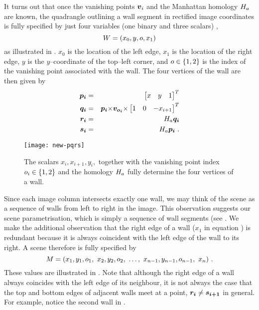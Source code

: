 It turns out that once the vanishing points $\vpt_i$ and the Manhattan
homology $\Hcf$ are known, the quadrangle outlining a wall segment in
rectified image coordinates is fully specified by just four variables
(one binary and three scalars) \changedsinceviva,
\begin{equation}
  \label{eq:wall-def}
  \Wall = ( x_0, y, \WallOrient, x_1 )
\end{equation}
as illustrated in . $x_0$ is the location of the left
edge, $x_1$ is the location of the right edge, $y$ is the
$y$--coordinate of the top--left corner, and $\WallOrient\in\{1,2\}$
is the index of the vanishing point associated with the wall. The four
vertices of the wall are then given by\changedsinceviva
\begin{eqnarray}
  \label{eq:pi}
  \vect{p_i} &=& \begin{bmatrix}x&y&1\end{bmatrix}^T \\
  \label{eq:qi}
  \vect{q_i} &=& \vect{p_i}\cross\vect{v_{\WallOrient_i}}\cross
               \begin{bmatrix}1&0&-x_{i+1}\end{bmatrix}^T\\
  \label{eq:ri}
  \vect{r_i} &=& \Hcf \vect{q_i}\\
  \label{eq:si}
  \vect{s_i} &=& \Hcf \vect{p_i} ~.
\end{eqnarray}

\begin{figure}[tb]%
  \centering
  \quad
  \texttt{[image: new-pqrs]}
  \caption{The scalars $x_i,x_{i+1},y_i,$ together with the
    vanishing point index $\WallOrient_i\in\{1,2\}$ and the homology $\Hcf$
    fully determine the four vertices of a wall.}
  \label{fig:pqrs}
\end{figure}

Since each image column intersects exactly one wall, we may think of
the scene as a sequence of walls from left to right in the image. This
observation suggests our scene parametrisation, which is simply a
sequence of wall segments (see . We make
the additional observation that the right edge of a wall ($x_1$ in
equation ) is redundant because it is always
coincident with the left edge of the wall to its right. A scene
therefore is fully specified by \changedsinceviva
\begin{equation}
  \Scene =
  ( x_1,y_1,\WallOrient_1,
  ~x_2,y_2,\WallOrient_2,
  ~\ldots,
  ~x_{n-1},y_{n-1},\WallOrient_{n-1},
  ~x_n ) ~.
  \label{eq:vertex-repr}
\end{equation}
These values are illustrated in
\changedsinceviva. Note that although
the right edge of a wall always coincides with the left edge of its
neighbour, it is not always the case that the top and bottom edges of
adjacent walls meet at a point, \ie $\vect{r_i} \neq \vect{s_{i+1}}$
in general. For example, notice the second wall in
\changedsinceviva.

